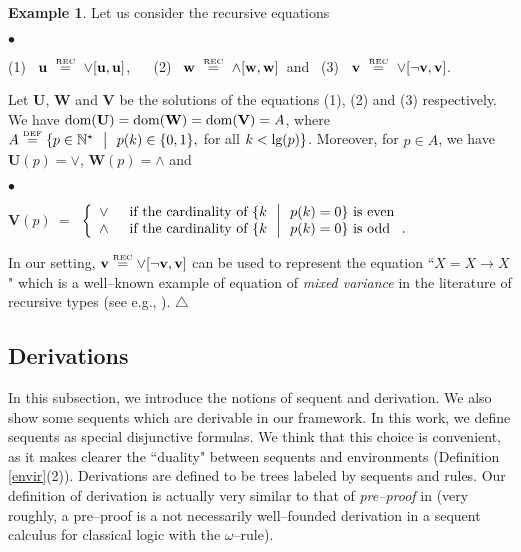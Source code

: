 \documentclass[copyright,creativecommons]{eptcs}
\def\eg{e.g., }
\newcommand{\NN}{\mathbb{N}}
\newcommand{\eqdef}{\stackrel{\text{\tiny \textnormal{DEF}}}{=}}
\newcommand{\eqrec}{\stackrel{\text{\tiny \textnormal{REC}}}{=}}
\newcommand{\st}{ \ \ \big{|} \ \ }
\newcommand{\bu}{\mathbf{u}}
\newcommand{\bw}{\mathbf{w}}
\newcommand{\bU}{\mathbf{U}}
\newcommand{\bW}{\mathbf{W}}
\newcommand{\bV}{\mathbf{V}}
\newcommand{\bbv}{\mathbf{v}}
\newcommand{\len}{\textnormal{lg}}
\newcommand{\dom}{\ensuremath{\textnormal{dom}}}
\theoremstyle{definition}
\newtheorem{Example}[theorem]{Example}
\newcommand{\squishlist}{
 \begin{list}{$\bullet$}
  { \setlength{\itemsep}{0pt}
     \setlength{\parsep}{3pt}
     \setlength{\topsep}{3pt}
     \setlength{\partopsep}{0pt}
     \setlength{\leftmargin}{1em}
     \setlength{\labelwidth}{1.5em}
     \setlength{\labelsep}{0.5em} } }
\newcommand{\squishend}{
  \end{list}  }
\begin{document}
 \begin{Example} \label{A to A}
Let us consider the recursive equations
\squishlist
\item[] {\centering  (1) \ $\bu \ \eqrec \ \vee[\bu, \bu]$\enspace, \ \  \qquad
(2) \ $\bw \ \eqrec \  \wedge[\bw, \bw]$\quad \   and  \quad \  (3) \ $\bbv \ \eqrec \  \vee[\neg \bbv ,\bbv]$\enspace. \par}
\squishend

\noindent Let $\bU$, $\bW$ and $\bV$ be the solutions of the equations (1), (2) and (3) respectively.
We have  $\dom(\bU) = \dom(\bW) = \dom(\bV) =A$, where $A \eqdef \{ p \in \NN^\star \st p(k) \in \{ 0 ,1\}, $ for all $k <\len(p) \}$.
Moreover,  for $p \in A$, we have $\bU(p) = \vee$,
 $\mathbf{W}(p) = \wedge$ and
 \squishlist
\item[] {\centering
${\bV}(p) \ = \ $ $\left\{
  \begin{array}{rl}
    \vee\enspace&  \hbox{if  the cardinality of $\{ k \st p(k) = 0 \}$  is even} \\
    \wedge\enspace &  \hbox{if  the cardinality of $\{ k \st p(k) = 0 \}$  is  odd \enspace.} \\  \end{array}
\right.$ \par}
\squishend
In our setting,  $\bbv \eqrec \vee[\neg \bbv , \bbv]$ can be used to represent   the equation ``$X = X \to X$" which is a well--known  example of equation of \emph{mixed variance} in the literature of recursive types (see \eg \cite{MelVou}).
\hfill$\triangle$
 \end{Example}




\subsection{Derivations} \label{subder}
In this subsection, we introduce the notions of sequent and derivation. We also
show some  sequents which are derivable in our framework.
In this work, we   define sequents as special disjunctive formulas.  We think that this
choice  is convenient, as it  makes clearer the ``duality"
between sequents and environments (Definition \ref{envir}(2)).
Derivations are defined to be   trees labeled by sequents and rules. Our definition of derivation is
actually very similar to that of
 \emph{pre--proof} in \cite{PTLC} (very roughly, a pre--proof is a
 not necessarily well--founded
 derivation in
a sequent calculus for
classical logic with the
 $\omega$--rule).
\end{document}
